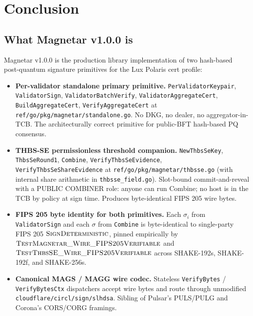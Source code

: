 \section{Conclusion}
\label{sec:conclusion}

\subsection{What Magnetar v1.0.0 is}
\label{sec:conclusion:is}

Magnetar v1.0.0 is the production library implementation of two
hash-based post-quantum signature primitives for the Lux Polaris
cert profile:
\begin{itemize}[leftmargin=2em,nosep]
  \item \textbf{Per-validator standalone primary primitive.}
        \texttt{PerValidatorKeypair}, \texttt{ValidatorSign},
        \texttt{ValidatorBatchVerify},
        \texttt{ValidatorAggregateCert},
        \texttt{BuildAggregateCert}, \texttt{VerifyAggregateCert}
        at \texttt{ref/go/pkg/magnetar/standalone.go}. No DKG, no
        dealer, no aggregator-in-TCB. The architecturally correct
        primitive for public-BFT hash-based PQ consensus.
  \item \textbf{THBS-SE permissionless threshold companion.}
        \texttt{NewThbsSeKey}, \texttt{ThbsSeRound1},
        \texttt{Combine}, \texttt{VerifyThbsSeEvidence},
        \texttt{VerifyThbsSeShareEvidence} at
        \texttt{ref/go/pkg/magnetar/thbsse.go} (with internal share
        arithmetic in \texttt{thbsse\_field.go}). Slot-bound
        commit-and-reveal with a PUBLIC COMBINER role: anyone
        can run Combine; no host is in the TCB by policy at sign
        time. Produces byte-identical FIPS 205 wire bytes.
  \item \textbf{FIPS 205 byte identity for both primitives.} Each
        $\sigma_i$ from \texttt{ValidatorSign} and each $\sigma$
        from \texttt{Combine} is byte-identical to single-party
        FIPS 205 $\textsc{SignDeterministic}$, pinned empirically
        by $\textsc{TestMagnetar\_Wire\_FIPS205Verifiable}$ and
        $\textsc{TestThbsSE\_Wire\_FIPS205Verifiable}$ across
        SHAKE-192s, SHAKE-192f, and SHAKE-256s.
  \item \textbf{Canonical MAGS / MAGG wire codec.} Stateless
        \texttt{VerifyBytes} / \texttt{VerifyBytesCtx} dispatchers
        accept wire bytes and route through unmodified
        \texttt{cloudflare/circl/sign/slhdsa}. Sibling of
        Pulsar's PULS/PULG and Corona's CORS/CORG framings.

\end{itemize}
